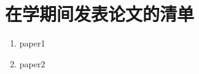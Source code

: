 \chapter*{在学期间发表论文的清单}
\thispagestyle{main}
\begin{enumerate}
  \item paper1
  \item paper2
\end{enumerate}
